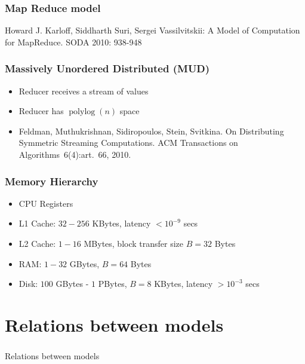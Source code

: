 \documentclass[12pt,aspectratio=169]{beamer}
\DeclareMathOperator{\polylog}{\text{polylog}}
\begin{document}
\begin{frame}\frametitle{Map Reduce model}
Howard J. Karloff, Siddharth Suri, Sergei Vassilvitskii: A Model of Computation for MapReduce. SODA 2010: 938-948
\end{frame}


\begin{frame}\frametitle{Massively Unordered Distributed (MUD)}
  \begin{itemize}
  \item
    Reducer receives a \alert{stream} of values
  \item
    Reducer has $\polylog(n)$ space
  \item
    Feldman, Muthukrishnan, Sidiropoulos, Stein, Svitkina.
 On Distributing Symmetric Streaming Computations.
ACM Transactions on Algorithms~6(4):art.~66, 2010.
  \end{itemize}
\end{frame}


\begin{frame}\frametitle{Memory Hierarchy}
  \begin{itemize}
  \item
    CPU Registers
  \item
    L1 Cache: $32-256$ KBytes, latency $< 10^{-9}$ secs
  \item
    L2 Cache: $1-16$ MBytes, block transfer size $B=32$ Bytes
  \item
    RAM: $1-32$ GBytes,  $B=64$ Bytes
  \item
    Disk: $100$ GBytes - $1$ PBytes,  $B=8$ KBytes, latency $> 10^{-3}$ secs
  \end{itemize}
\end{frame}



  \section{Relations between models}
\begin{frame}\frametitle{}
  \begin{center}
    \Huge
    Relations between models
  \end{center}
\end{frame}
\end{document}
